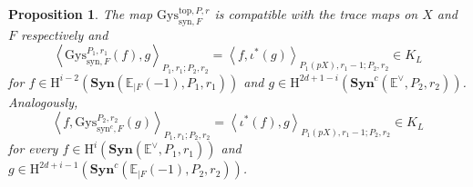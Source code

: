 \documentclass[asterisque,english]{smfart}
\newtheorem{proposition}[theo]{Proposition}
\begin{document}
\begin{proposition}
\label{prop:GysDual}The map $\mathrm{Gys}_{\mathrm{syn},F}^{\mathrm{top}
,P,r}$ is compatible with the trace maps on $X$ and $F$ respectively and
$$
\left\langle \mathrm{Gys}_{\mathrm{syn},F}^{P_{1},r_{1}}\left( f\right)
,g\right\rangle _{P_{1},r_{1};P_{2},r_{2}}=\left\langle f,\iota ^{\ast
}\left( g\right) \right\rangle _{P_{1}\left( pX\right) ,r_{1}-1;P_{2},r_{2}}\in K_L
$$
for $f\in \mathrm{H}^{i-2}\left( \mathbf{Syn}\left( 
\mathbb{E}_{\mid F}\left( -1\right),P_1,r_1 \right) \right) $ and $g\in \mathrm{H}
^{2d+1-i}\left( \mathbf{Syn}^c\left( \mathbb{E}^{\vee
},P_2,r_2\right) \right) $. Analogously,
$$
\left\langle f, \mathrm{Gys}_{\mathrm{syn}^c,F}^{P_2,r_2}\left( g\right)
\right\rangle _{P_{1},r_{1};P_{2},r_{2}}=\left\langle \iota ^{\ast
}\left( f\right),g \right\rangle _{P_{1}\left( pX\right) ,r_{1}-1;P_{2},r_{2}}\in K_L
$$
for every $f\in \mathrm{H}
^i\left( \mathbf{Syn}\left( \mathbb{E}^{\vee
},P_1,r_1\right) \right) $ and $g\in \mathrm{H}^{2d+i-1}\left( \mathbf{Syn}^c\left( 
\mathbb{E}_{\mid F}\left( -1\right),P_2,r_2 \right) \right) $.

\end{proposition}
\end{document}
